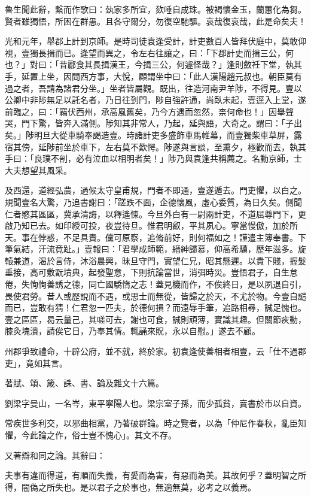 \begin{pinyinscope}
魯生聞此辭，繫而作歌曰：埶家多所宜，欬唾自成珠。被褐懷金玉，蘭蕙化為芻。賢者雖獨悟，所困在群愚。且各守爾分，勿復空馳驅。哀哉復哀哉，此是命矣夫！

光和元年，舉郡上計到京師。是時司徒袁逢受計，計吏數百人皆拜伏庭中，莫敢仰視，壹獨長揖而已。逢望而異之，令左右往讓之，曰：「下郡計史而揖三公，何也？」對曰：「昔酈食其長揖漢王，今揖三公，何遽怪哉？」逢則斂衽下堂，執其手，延置上坐，因問西方事，大悅，顧謂坐中曰：「此人漢陽趙元叔也。朝臣莫有過之者，吾請為諸君分坐。」坐者皆屬觀。既出，往造河南尹羊陟，不得見。壹以公卿中非陟無足以託名者，乃日往到門，陟自強許通，尚臥未起，壹逕入上堂，遂前臨之，曰：「竊伏西州，承高風舊矣，乃今方遇而忽然，柰何命也！」因舉聲哭，門下驚，皆奔入滿側。陟知其非常人，乃起，延與語，大奇之。謂曰：「子出矣。」陟明旦大從車騎奉謁造壹。時諸計吏多盛飾車馬帷幕，而壹獨柴車草屏，露宿其傍，延陟前坐於車下，左右莫不歎愕。陟遂與言談，至熏夕，極歡而去，執其手曰：「良璞不剖，必有泣血以相明者矣！」陟乃與袁逢共稱薦之。名動京師，士大夫想望其風采。

及西還，道經弘農，過候太守皇甫規，門者不即通，壹遂遁去。門吏懼，以白之。規聞壹名大驚，乃追書謝曰：「蹉跌不面，企德懷風，虛心委質，為日久矣。側聞仁者愍其區區，冀承清誨，以釋遙悚。今旦外白有一尉兩計吏，不道屈尊門下，更啟乃知已去。如印綬可投，夜豈待旦。惟君明叡，平其夙心。寧當慢傲，加於所天。事在悖惑，不足具責。儻可原察，追脩前好，則何福如之！謹遣主簿奉書。下筆氣結，汗流竟趾。」壹報曰：「君學成師範，縉紳歸慕，仰高希驥，歷年滋多。旋轅兼道，渴於言侍，沐浴晨興，昧旦守門，實望仁兄，昭其懸遲。以貴下賤，握髮垂接，高可敷翫墳典，起發聖意，下則抗論當世，消弭時災。豈悟君子，自生怠倦，失恂恂善誘之德，同亡國驕惰之志！蓋見機而作，不俟終日，是以夙退自引，畏使君勞。昔人或歷說而不遇，或思士而無從，皆歸之於天，不尤於物。今壹自譴而已，豈敢有猜！仁君忽一匹夫，於德何損？而遠辱手筆，追路相尋，誠足愧也。壹之區區，曷云量己，其嗟可去，謝也可食，誠則頑薄，實識其趣。但關節疢動，膝灸塊潰，請俟它日，乃奉其情。輒誦來貺，永以自慰。」遂去不顧。

州郡爭致禮命，十辟公府，並不就，終於家。初袁逢使善相者相壹，云「仕不過郡吏」，竟如其言。

著賦、頌、箴、誄、書、論及雜文十六篇。

劉梁字曼山，一名岑，東平寧陽人也。梁宗室子孫，而少孤貧，賣書於市以自資。

常疾世多利交，以邪曲相黨，乃著破群論。時之覽者，以為「仲尼作春秋，亂臣知懼，今此論之作，俗士豈不愧心」。其文不存。

又著辯和同之論。其辭曰：

夫事有違而得道，有順而失義，有愛而為害，有惡而為美。其故何乎？蓋明智之所得，闇偽之所失也。是以君子之於事也，無適無莫，必考之以義焉。


\end{pinyinscope}
